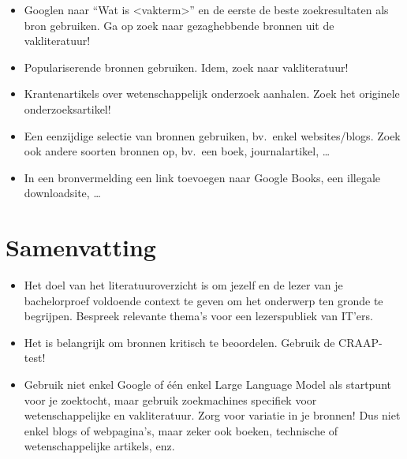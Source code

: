 \begin{itemize}
  \item Googlen naar ``Wat is <vakterm>'' en de eerste de beste zoekresultaten als bron gebruiken. Ga op zoek naar gezaghebbende bronnen uit de vakliteratuur!

  \item Populariserende bronnen gebruiken. Idem, zoek naar vakliteratuur!

  \item Krantenartikels over wetenschappelijk onderzoek aanhalen. Zoek het originele onderzoeksartikel!

  \item Een eenzijdige selectie van bronnen gebruiken, bv.~enkel websites/blogs. Zoek ook andere soorten bronnen op, bv.\ een boek, journalartikel, \ldots

  \item In een bronvermelding een link toevoegen naar Google Books, een illegale downloadsite, \ldots
\end{itemize}

\section{Samenvatting}%
\label{sec:literatuuroverzicht_samenvatting}

\begin{itemize}
  \item Het doel van het literatuuroverzicht is om jezelf en de lezer van je bachelorproef voldoende context te geven om het onderwerp ten gronde te begrijpen. Bespreek relevante thema's voor een lezerspubliek van IT'ers.
  \item Het is belangrijk om bronnen kritisch te beoordelen. Gebruik de CRAAP-test!
  \item Gebruik niet enkel Google  of \'e\'en enkel Large Language Model als startpunt voor je zoektocht, maar gebruik zoekmachines specifiek voor wetenschappelijke en vakliteratuur. Zorg voor variatie in je bronnen! Dus niet enkel blogs of webpagina's, maar zeker ook boeken, technische of wetenschappelijke artikels, enz.
\end{itemize}
